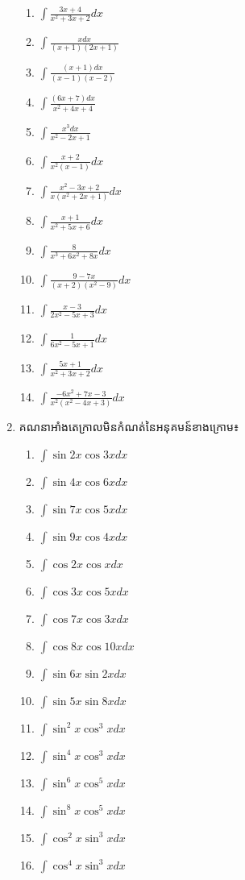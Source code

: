 \documentclass[12pt,a4paper]{article}
\begin{document}
\begin{enumerate}[I]
\begin{multicols}{3}
\begin{enumerate}[a]
				\item $\int \frac{3x+4}{x^2+3x+2} dx$
				\item $\int \frac{xdx}{(x+1)(2x+1)}$
				\item $\int \frac{(x+1)dx}{(x-1)(x-2)}$
				\item $\int \frac{(6x+7)dx}{x^2+4x+4}$
				\item $\int \frac{x^3dx}{x^2-2x+1}$
				\item $\int \frac{x+2}{x^2(x-1)}dx$
				\item $\int \frac{x^2-3x+2}{x(x^2+2x+1)}dx$
				\item $\int \frac{x+1}{x^2+5x+6}dx$
				\item $\int \frac{8}{x^3+6x^2+8x}dx$
				\item $\int \frac{9-7x}{(x+2)(x^2-9)}dx$
				\item $\int \frac{x-3}{2x^2-5x+3}dx$
				\item $\int \frac{1}{6x^2-5x+1}dx$
				\item $\int \frac{5x+1}{x^2+3x+2}dx$
				\item $\int \frac{-6x^2+7x-3}{x^2(x^2-4x+3)}dx$
			\end{enumerate}
		\end{multicols}
		\item គណនាអាំងតេក្រាលមិនកំណត់នៃអនុគមន៍ខាងក្រោម៖
		\begin{multicols}{3}
			\begin{enumerate}[1]
				\item $\int \sin2x\cos3x dx$
				\item $\int \sin4x\cos6x dx$
				\item $\int \sin7x\cos5x dx$
				\item $\int \sin9x\cos4x dx$
				\item $\int \cos2x\cos x dx$
				\item $\int \cos3x\cos5x dx$
				\item $\int \cos7x\cos3x dx$
				\item $\int \cos8x\cos10x dx$
				\item $\int \sin6x\sin2x dx$
				\item $\int \sin5x\sin8x dx$
				\item $\int \sin^2x\cos^3x dx$
				\item $\int \sin^4x\cos^3x dx$
				\item $\int \sin^6x\cos^5x dx$
				\item $\int \sin^8x\cos^5x dx$
				\item $\int \cos^2x\sin^3x dx$
				\item $\int \cos^4x\sin^3x dx$

\end{enumerate}
\end{multicols}
\end{enumerate}
\end{document}
